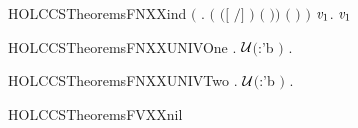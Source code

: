 \begin{SaveVerbatim}{HOLCCSTheoremsFNXXind}
       \ensuremath{(}\HOLSymConst{\HOLTokenForall{}}  .
          \ensuremath{(}   \HOLSymConst{\HOLTokenImp{}}  \ensuremath{(}\ensuremath{[}  \ensuremath{/}\ensuremath{]} \ensuremath{)} \ensuremath{(}  \ensuremath{)}\ensuremath{)} \HOLSymConst{\HOLTokenImp{}}
           \ensuremath{(}  \ensuremath{)} \ensuremath{)} \HOLSymConst{\HOLTokenImp{}}
       \HOLSymConst{\HOLTokenForall{}} \ensuremath{\HOLBoundVar{v}\sb{\mathrm{1}}}.   \ensuremath{\HOLBoundVar{v}\sb{\mathrm{1}}}
\end{SaveVerbatim}
\newcommand{\HOLCCSTheoremsFNXXind}{\UseVerbatim{HOLCCSTheoremsFNXXind}}
\begin{SaveVerbatim}{HOLCCSTheoremsFNXXUNIVOne}
\HOLTokenTurnstile{} \HOLSymConst{\HOLTokenForall{}}.   \HOLSymConst{\HOLTokenNotEqual{}} \ensuremath{{\cal{U}}}\ensuremath{(}:'b \ensuremath{)} \HOLSymConst{\HOLTokenImp{}} \HOLSymConst{\HOLTokenExists{}}.  \HOLConst{\HOLTokenNotIn{}}  
\end{SaveVerbatim}
\newcommand{\HOLCCSTheoremsFNXXUNIVOne}{\UseVerbatim{HOLCCSTheoremsFNXXUNIVOne}}
\begin{SaveVerbatim}{HOLCCSTheoremsFNXXUNIVTwo}
\HOLTokenTurnstile{} \HOLSymConst{\HOLTokenForall{}} .
       \HOLConst{\HOLTokenUnion{}}   \HOLSymConst{\HOLTokenNotEqual{}} \ensuremath{{\cal{U}}}\ensuremath{(}:'b \ensuremath{)} \HOLSymConst{\HOLTokenImp{}}
     \HOLSymConst{\HOLTokenExists{}}.  \HOLConst{\HOLTokenNotIn{}}   \HOLSymConst{\HOLTokenConj{}}  \HOLConst{\HOLTokenNotIn{}}  
\end{SaveVerbatim}
\newcommand{\HOLCCSTheoremsFNXXUNIVTwo}{\UseVerbatim{HOLCCSTheoremsFNXXUNIVTwo}}
\begin{SaveVerbatim}{HOLCCSTheoremsFVXXnil}
\HOLTokenTurnstile{}   \HOLSymConst{\ensuremath{=}} \HOLTokenLeftbrace{}\HOLTokenRightbrace{}
\end{SaveVerbatim}
